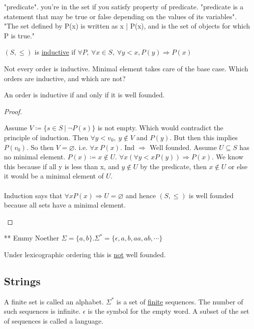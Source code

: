 \documentclass[../598comp.tex]{subfiles}
\begin{document}
\begin{definition}[Predicate]
  "predicate". you're in the set if you satisfy property of predicate. "predicate is a statement that may be true or false depending on the values of its variables". "The set defined by P(x) is written as {x | P(x)}, and is the set of objects for which P is true."
\end{definition} 

$(S, \leq)$ is \ul{inductive} if $\forall P, \ \forall x \in S, \ \forall y < x, P(y) \Rightarrow P(x)$

Not every order is inductive. Minimal element takes care of the base case. Which orders are inductive, and which are not?
\begin{theorem}
  An order is inductive if and only if it is well founded.
  \begin{proof}
    \begin{enumerate}
      \ii[]
      \ii
      Assume $V \coloneqq \{s \in S \ | \ \neg P(s)\}$ is not empty. Which would contradict the principle of induction. Then $\forall y < v_0, \ y \notin V$ and $P(y)$. But then this implies $P(v_0)$. So then $V = \varnothing$. i.e. $\forall x \ P(x)$.
      \ii
      Ind $\Rightarrow$ Well founded. 
      Assume $U \subseteq S$ has no minimal element. $P(x) \coloneqq x \notin U$.
      $\forall x (\forall y < x P(y)) \Rightarrow P(x)$. We know this because if all y is less than x, and $y \notin U$ by the predicate, then $x \notin U$ or else it would be a minimal element of $U$.
      \\\\
      Induction says that $\forall x P(x) \Rightarrow U = \varnothing$  and hence $(S, \leq)$ is well founded because all sets have a minimal element.
    \end{enumerate} 
  \end{proof} 
\end{theorem} 

** Emmy Noether
$\Sigma = \{a, b\}. \Sigma^* = \{\epsilon, a, b, aa, ab, \cdots\}$

Under lexicographic ordering this is \ul{not} well founded.

\subsection{Strings}
A finite set is called an alphabet. $\Sigma^*$ is a set of \ul{finite} sequences. The number of such sequences is infinite. $\epsilon$ is the symbol for the empty word. A subset of the set of sequences is called a language.
\end{document}

